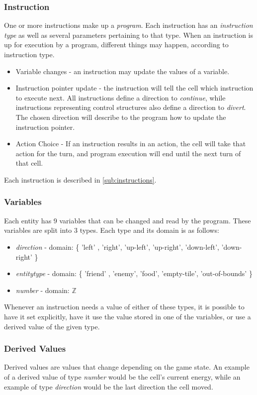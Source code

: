 \subsubsection{Instruction}
One or more instructions make up a \emph{program}. Each instruction has an \emph{instruction type} as well as several parameters pertaining to that type. When an instruction is up for execution by a program, different things may happen, according to instruction type.
\begin{itemize}
\item Variable changes - an instruction may update the values of a variable.
\item Instruction pointer update - the instruction will tell the cell which instruction to execute next. All instructions define a direction to \emph{continue}, while instructions representing control structures also define a direction to \emph{divert}. The chosen direction will describe to the program how to update the instruction pointer.
\item Action Choice - If an instruction results in an action, the cell will take that action for the turn, and program execution will end until the next turn of that cell.
\end{itemize}
Each instruction is described in \autoref{sub:instructions}.

\subsubsection{Variables}
Each entity has 9 variables that can be changed and read by the program. These variables are split into 3 types. Each type and its domain is as follows:
\begin{itemize}
\item \emph{direction} - domain: \{ 'left' , 'right', 'up-left', 'up-right', 'down-left', 'down-right' \}
\item \emph{entitytype} - domain: \{ 'friend' , 'enemy', 'food', 'empty-tile', 'out-of-bounds' \}
\item \emph{number} - domain: $\mathbb{Z}$
\end{itemize}
Whenever an instruction needs a value of either of these types, it is possible to have it set explicitly, have it use the value stored in one of the variables, or use a derived value of the given type.

\subsubsection{Derived Values}
Derived values are values that change depending on the game state. An example of a derived value of type \emph{number} would be the cell's current energy, while an example of type \emph{direction} would be the last direction the cell moved.


